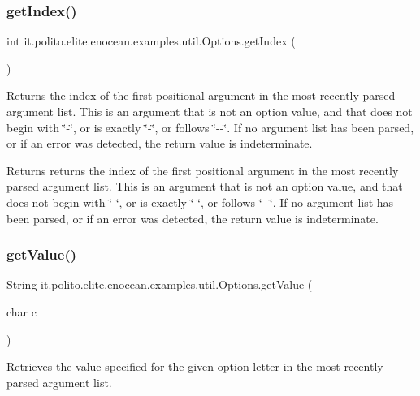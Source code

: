 \subsubsection{\texorpdfstring{get\+Index()}{getIndex()}}
{\footnotesize\ttfamily int it.\+polito.\+elite.\+enocean.\+examples.\+util.\+Options.\+get\+Index (\begin{DoxyParamCaption}{ }\end{DoxyParamCaption})}

Returns the index of the first positional argument in the most recently parsed argument list. This is an argument that is not an option value, and that does not begin with \char`\"{}-\/\char`\"{}, or is exactly \char`\"{}-\/\char`\"{}, or follows \char`\"{}-\/-\/\char`\"{}. If no argument list has been parsed, or if an error was detected, the return value is indeterminate. \begin{DoxyReturn}{Returns}
returns the index of the first positional argument in the most recently parsed argument list. This is an argument that is not an option value, and that does not begin with \char`\"{}-\/\char`\"{}, or is exactly \char`\"{}-\/\char`\"{}, or follows \char`\"{}-\/-\/\char`\"{}. If no argument list has been parsed, or if an error was detected, the return value is indeterminate. 
\end{DoxyReturn}
\hypertarget{classit_1_1polito_1_1elite_1_1enocean_1_1examples_1_1util_1_1_options_a1d7582549531826d41e895665179e3fd}{}\label{classit_1_1polito_1_1elite_1_1enocean_1_1examples_1_1util_1_1_options_a1d7582549531826d41e895665179e3fd} 
\subsubsection{\texorpdfstring{get\+Value()}{getValue()}}
{\footnotesize\ttfamily String it.\+polito.\+elite.\+enocean.\+examples.\+util.\+Options.\+get\+Value (\begin{DoxyParamCaption}\item[{char}]{c }\end{DoxyParamCaption})}

Retrieves the value specified for the given option letter in the most recently parsed argument list.

